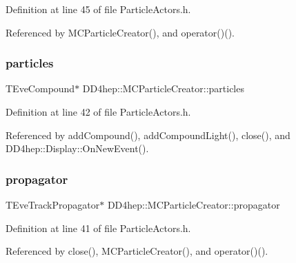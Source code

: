 Definition at line 45 of file Particle\+Actors.\+h.



Referenced by M\+C\+Particle\+Creator(), and operator()().

\hypertarget{struct_d_d4hep_1_1_m_c_particle_creator_aee3566635d042c98a8f849ff6213873c}{}\label{struct_d_d4hep_1_1_m_c_particle_creator_aee3566635d042c98a8f849ff6213873c} 
\subsubsection{\texorpdfstring{particles}{particles}}
{\footnotesize\ttfamily T\+Eve\+Compound$\ast$ D\+D4hep\+::\+M\+C\+Particle\+Creator\+::particles}



Definition at line 42 of file Particle\+Actors.\+h.



Referenced by add\+Compound(), add\+Compound\+Light(), close(), and D\+D4hep\+::\+Display\+::\+On\+New\+Event().

\hypertarget{struct_d_d4hep_1_1_m_c_particle_creator_a536aef5f2059670db5b8dc81de6559a4}{}\label{struct_d_d4hep_1_1_m_c_particle_creator_a536aef5f2059670db5b8dc81de6559a4} 
\subsubsection{\texorpdfstring{propagator}{propagator}}
{\footnotesize\ttfamily T\+Eve\+Track\+Propagator$\ast$ D\+D4hep\+::\+M\+C\+Particle\+Creator\+::propagator}



Definition at line 41 of file Particle\+Actors.\+h.



Referenced by close(), M\+C\+Particle\+Creator(), and operator()().

\hypertarget{struct_d_d4hep_1_1_m_c_particle_creator_a622e212ec5e4471e2ae306e44839a69c}{}\label{struct_d_d4hep_1_1_m_c_particle_creator_a622e212ec5e4471e2ae306e44839a69c} 
